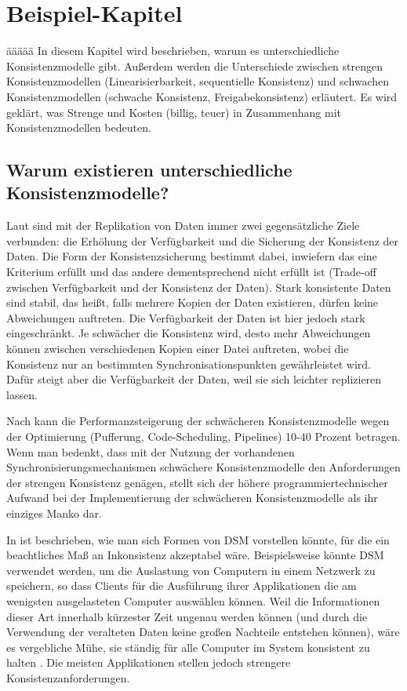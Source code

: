 \chapter{Beispiel-Kapitel}
äääää
In diesem Kapitel wird beschrieben, warum es unterschiedliche Konsistenzmodelle gibt. Außerdem werden die Unterschiede zwischen strengen Konsistenzmodellen (Linearisierbarkeit, sequentielle Konsistenz) und schwachen Konsistenzmodellen (schwache Konsistenz, Freigabekonsistenz) erläutert. Es wird geklärt, was Strenge und Kosten (billig, teuer) in Zusammenhang mit Konsistenzmodellen bedeuten.

\section{Warum existieren unterschiedliche Konsistenzmodelle?}

Laut \cite{Malte:97} sind mit der Replikation von Daten immer zwei gegensätzliche Ziele verbunden: die Erhöhung der Verfügbarkeit und die Sicherung der Konsistenz der Daten. Die Form der Konsistenzsicherung bestimmt dabei, inwiefern das eine Kriterium erfüllt und das andere dementsprechend nicht erfüllt ist (Trade-off zwischen Verfügbarkeit und der Konsistenz der Daten). Stark konsistente Daten sind stabil, das heißt, falls mehrere Kopien der Daten existieren, dürfen keine Abweichungen auftreten. Die Verfügbarkeit der Daten ist hier jedoch stark eingeschränkt. Je schwächer die Konsistenz wird, desto mehr Abweichungen können zwischen verschiedenen Kopien einer Datei auftreten, wobei die Konsistenz nur an bestimmten Synchronisationspunkten gewährleistet wird. Dafür steigt aber die Verfügbarkeit der Daten, weil sie sich leichter replizieren lassen.

Nach \cite{Mosberger:93} kann die Performanzsteigerung der schwächeren Konsistenzmodelle wegen der Optimierung (Pufferung, Code-Scheduling, Pipelines) 10-40 Prozent betragen. Wenn man bedenkt, dass mit der Nutzung der vorhandenen Synchronisierungsmechanismen schwächere Konsistenzmodelle den Anforderungen der strengen Konsistenz genägen, stellt sich der höhere programmiertechnischer Aufwand bei der Implementierung der schwächeren Konsistenzmodelle als ihr einziges Manko dar.

In \cite{Cheriton:85} ist beschrieben, wie man sich Formen von DSM vorstellen könnte, für die ein beachtliches Maß an Inkonsistenz akzeptabel wäre. Beispielsweise könnte DSM verwendet werden, um die Auslastung von Computern in einem Netzwerk zu speichern, so dass Clients für die Ausführung ihrer Applikationen die am wenigsten ausgelasteten Computer auswählen können. Weil die Informationen dieser Art innerhalb kürzester Zeit ungenau werden können (und durch die Verwendung der veralteten Daten keine großen Nachteile entstehen können), wäre es vergebliche Mühe, sie ständig für alle Computer im System konsistent zu halten \cite{Coulouris:02}. Die meisten Applikationen stellen jedoch strengere Konsistenzanforderungen.

